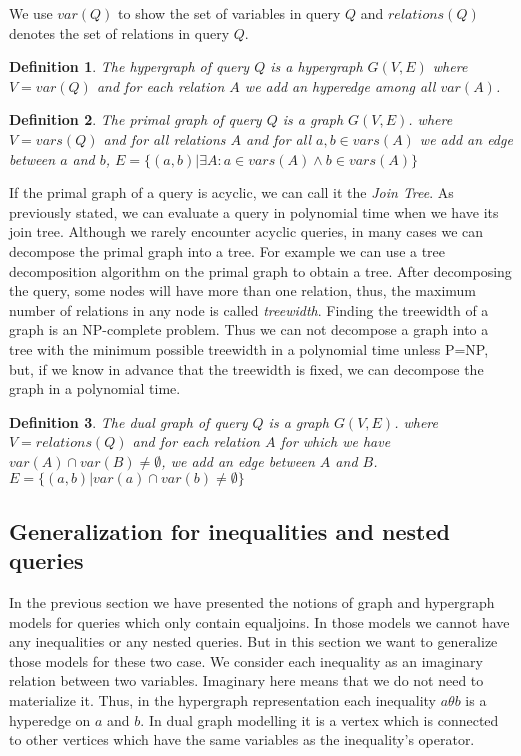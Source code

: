 \documentclass[12pt]{article}
\newtheorem{definition}{Definition}
\begin{document}
We use $var(Q)$ to show the set of variables in query $Q$ and $relations(Q)$ denotes the set of relations in query $Q$.
\begin{definition}
\label{def:hypergraph} 
The hypergraph of query $Q$ is a hypergraph $G(V,E)$ where $V=var(Q)$ and for each relation $A$ we add an hyperedge among all $var(A)$.
\end{definition}
\begin{definition}
\label{def:primalgraph}
The primal graph of query $Q$ is a graph $G(V,E)$. where $V=vars(Q)$ and for all relations $A$ and for all $a,b\in vars(A)$ we add an edge between $a$ and $b$, $E=\{(a,b)|\exists A: a\in vars(A)\land b\in vars(A)\}$
\end{definition}
If the primal graph of a query is acyclic, we can call it the \emph{Join Tree}\cite{1}. As previously stated, we can evaluate a query in polynomial time when we have its join tree. Although we rarely encounter acyclic queries, in many cases we can decompose the primal graph into a tree. For example we can use a tree decomposition algorithm on the primal graph to obtain a tree. After decomposing the query, some nodes will have more than one relation, thus, the maximum number of relations in any node is called \emph{treewidth}. 
Finding the treewidth of a graph is an NP-complete problem\cite{treewidth}. Thus we can not decompose a graph into a tree with the minimum possible treewidth in a polynomial time unless P=NP, but, if we know in advance that the treewidth is fixed, we can decompose the graph in a polynomial time. 
\begin{definition}
\label{def:dualgraph}
The dual graph of query $Q$ is a graph $G(V,E)$. where $V=relations(Q)$ and for each relation $A$ for which we have $var(A)\cap var(B)\neq \emptyset$, we add an edge between $A$ and $B$. $E=\{(a,b)|var(a)\cap var(b)\neq\emptyset\}$
\end{definition}
\subsection{Generalization for inequalities and nested queries}
\label{sec:generalization}
In the previous section we have presented the notions of graph and hypergraph models for queries which only contain equaljoins. In those models we cannot have any inequalities or any nested queries. But in this section we want to generalize those models for these two case. We consider each inequality as an imaginary relation between two variables. Imaginary here means that we do not need to materialize it. Thus, in the hypergraph representation each inequality $a\theta b$ is a hyperedge on $a$ and $b$. In dual graph modelling it is a vertex which is connected to other vertices which have the same variables as the inequality's operator.\\\par
\end{document}
